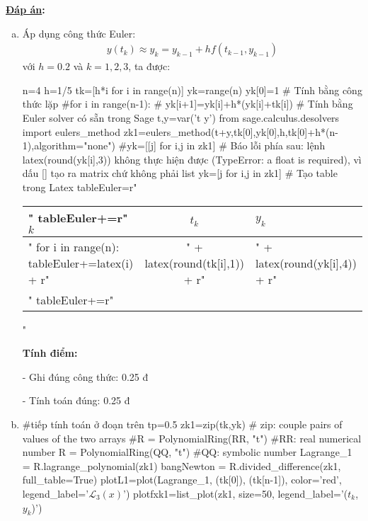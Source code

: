 \documentclass[12pt]{article}
\newcommand{\Solution}{
\medskip
{\bf \underline{Đáp án}:}
}
\begin{document}
\Solution
\begin{enumerate}[a).]
\item Áp dụng công thức Euler:
\begin{align*}
 y(t_k) \approx y_k = y_{k-1} + h f(t_{k-1},y_{k-1})
\end{align*}
với $h=0.2$ và $k=1, 2, 3$, ta được:
\begin{sagesilent}
 n=4
 h=1/5
 tk=[h*i for i in range(n)]
 yk=range(n)
 yk[0]=1
 # Tính bằng công thức lặp
 #for i in range(n-1):
 #  yk[i+1]=yk[i]+h*(yk[i]+tk[i])
 # Tính bằng Euler solver có sẵn trong Sage
 t,y=var('t y')
 from sage.calculus.desolvers import eulers_method
 zk1=eulers_method(t+y,tk[0],yk[0],h,tk[0]+h*(n-1),algorithm="none")
 #yk=[[j] for i,j in zk1] # Báo lỗi phía sau: lệnh latex(round(yk[i],3)) không thực hiện được (TypeError: a float is required), vì dấu [] tạo ra matrix chứ không phải list
 yk=[j for i,j in zk1]
 # Tạo table trong Latex
 tableEuler=r"\begin{tabular}{l|c|l}"
 tableEuler+=r"$k$ & $t_k$ & $y_k$ \\ \hline"
 for i in range(n):
   tableEuler+=latex(i) + r"&" + latex(round(tk[i],1)) + r"&" + latex(round(yk[i],4)) + r"\\"
 tableEuler+=r"\end{tabular}"
\end{sagesilent}

  \begin{center}  \end{center} 

  \textbf{Tính điểm:}
  
  - Ghi đúng công thức: 0.25 đ
  
  - Tính toán đúng: 0.25 đ
  
\item
\begin{sagesilent}
 #tiếp tính toán ở đoạn trên
 tp=0.5
 zk1=zip(tk,yk) # zip: couple pairs of values of the two arrays
 #R = PolynomialRing(RR, "t") #RR: real numerical number
 R = PolynomialRing(QQ, "t") #QQ: symbolic number
 Lagrange_1 = R.lagrange_polynomial(zk1)
 bangNewton = R.divided_difference(zk1, full_table=True)
 plotL1=plot(Lagrange_1, (tk[0]), (tk[n-1]), color='red', legend_label='$\mathcal{L}_3(x)$')
 plotfxk1=list_plot(zk1, size=50, legend_label='($t_k$,$y_k$)')


\end{sagesilent}
\end{enumerate}
\end{document}
